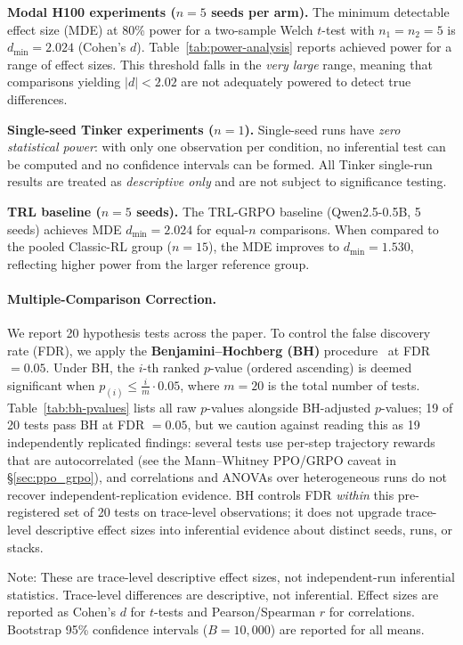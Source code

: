 \textbf{Modal H100 experiments ($n = 5$ seeds per arm).}
The minimum detectable effect size (MDE) at 80\% power for a two-sample
Welch $t$-test with $n_1 = n_2 = 5$ is
$d_{\min} = 2.024$ (Cohen's $d$).
Table~\ref{tab:power-analysis} reports achieved power for a range of effect sizes.
This threshold falls in the \emph{very large} range, meaning that
comparisons yielding $|d| < 2.02$
are not adequately powered to detect true differences.

\textbf{Single-seed Tinker experiments ($n = 1$).}
Single-seed runs have \emph{zero statistical power}: with only one observation per
condition, no inferential test can be computed and no confidence intervals can be
formed.  All Tinker single-run results are treated as \emph{descriptive only} and
are not subject to significance testing.

\textbf{TRL baseline ($n = 5$ seeds).}
The TRL-GRPO baseline (Qwen2.5-0.5B, 5 seeds) achieves MDE
$d_{\min} = 2.024$ for equal-$n$ comparisons.
When compared to the pooled Classic-RL group ($n = 15$), the MDE
improves to $d_{\min} = 1.530$,
reflecting higher power from the larger reference group.

\paragraph{Multiple-Comparison Correction.}
We report 20 hypothesis tests across the paper.
To control the false discovery rate (FDR), we apply the
\textbf{Benjamini--Hochberg (BH)} procedure~\cite{benjamini1995controlling}
at FDR $= 0.05$.  Under BH, the $i$-th ranked $p$-value (ordered ascending)
is deemed significant when $p_{(i)} \le \frac{i}{m} \cdot 0.05$,
where $m = 20$ is the total number of tests.
Table~\ref{tab:bh-pvalues} lists all raw $p$-values alongside BH-adjusted
$p$-values; 19 of 20 tests pass BH at FDR $=0.05$, but we caution against
reading this as 19 independently replicated findings: several tests use
per-step trajectory rewards that are autocorrelated (see the Mann--Whitney
PPO/GRPO caveat in \S\ref{sec:ppo_grpo}), and correlations and ANOVAs
over heterogeneous runs do not recover independent-replication evidence.
BH controls FDR \emph{within} this pre-registered set of 20 tests on
trace-level observations; it does not upgrade trace-level descriptive
effect sizes into inferential evidence about distinct seeds, runs, or stacks.

Note: These are trace-level descriptive effect sizes, not independent-run inferential statistics. Trace-level differences are descriptive, not inferential.  Effect sizes are reported as Cohen's $d$ for
$t$-tests and Pearson/Spearman $r$ for correlations.  Bootstrap 95\%
confidence intervals ($B = 10{,}000$) are reported for all means.

